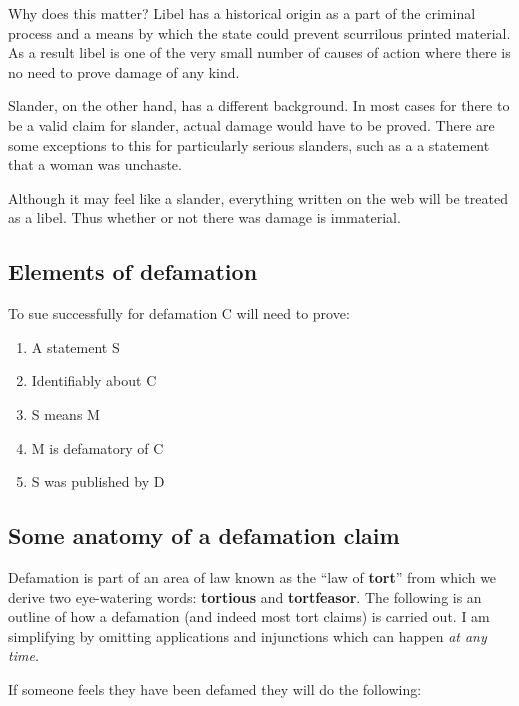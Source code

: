 \documentclass[]{article}
\begin{document}
Why does this matter? Libel has a historical origin as a part of the
criminal process and a means by which the state could prevent scurrilous
printed material. As a result libel is one of the very small number of
causes of action where there is no need to prove damage of any kind.

Slander, on the other hand, has a different background. In most cases
for there to be a valid claim for slander, actual damage would have to
be proved. There are some exceptions to this for particularly serious
slanders, such as a a statement that a woman was unchaste.

Although it may feel like a slander, everything written on the web will
be treated as a libel. Thus whether or not there was damage is
immaterial.

\subsection{Elements of defamation}

To sue successfully for defamation C will need to prove:

\begin{enumerate}
\item
  A statement S
\item
  Identifiably about C
\item
  S means M
\item
  M is defamatory of C
\item
  S was published by D
\end{enumerate}

\subsection{Some anatomy of a defamation claim}

Defamation is part of an area of law known as the ``law of
\textbf{tort}{'' from which we derive two eye-watering words:
}\textbf{tortious} {and }\textbf{tortfeasor}{. The following is an
outline of how a defamation (and indeed most tort claims) is carried
out. I am simplifying by omitting applications and injunctions which can
happen }\emph{{at any time.}}

If someone feels they have been defamed they will do the following:
\end{document}
